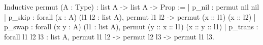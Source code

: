 Inductive permut (A : Type) : list A -> list A -> Prop :=
  | p_nil  : permut nil nil
  | p_skip : forall (x : A) (l1 l2 : list A),
                permut l1 l2 -> 
                permut (x :: l1) (x :: l2)  
  | p_swap : forall (x y : A) (l1 : list A),
                permut (y :: x :: l1) (x :: y :: l1)
  | p_trans : forall l1 l2 l3 : list A,
                 permut l1 l2   -> 
                 permut l2 l3 ->
                 permut l1 l3.